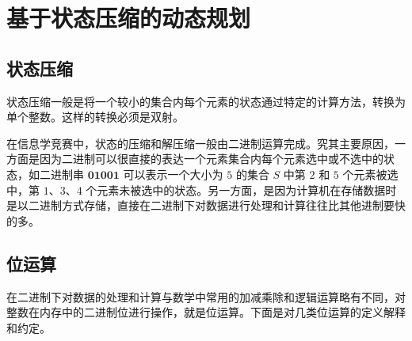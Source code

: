 
\chapter{基于状态压缩的动态规划}

\section{状态压缩}

状态压缩一般是将一个较小的集合内每个元素的状态通过特定的计算方法，转换为单个整数。这样的转换必须是双射。

在信息学竞赛中，状态的压缩和解压缩一般由二进制运算完成。究其主要原因，一方面是因为二进制可以很直接的表达一个元素集合内每个元素选中或不选中的状态，如二进制串
\(\mathbf{01001}\) 可以表示一个大小为 \(5\) 的集合 \(S\) 中第 \(2\) 和
\(5\) 个元素被选中，第 \(1\)、\(3\)、\(4\)
个元素未被选中的状态。另一方面，是因为计算机在存储数据时是以二进制方式存储，直接在二进制下对数据进行处理和计算往往比其他进制要快的多。

\section{位运算}

在二进制下对数据的处理和计算与数学中常用的加减乘除和逻辑运算略有不同，对整数在内存中的二进制位进行操作，就是位运算。下面是对几类位运算的定义解释和约定。

